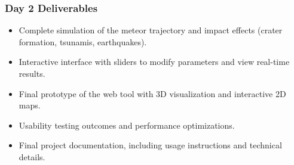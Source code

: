 \documentclass[conference]{IEEEtran}
\begin{document}
\subsubsection*{Day 2 Deliverables}
\begin{itemize}
	\item Complete simulation of the meteor trajectory and impact effects
	      (crater formation, tsunamis, earthquakes).
	\item Interactive interface with sliders to modify parameters and view
	      real-time results.
	\item Final prototype of the web tool with 3D visualization and interactive
	      2D maps.
	\item Usability testing outcomes and performance optimizations.
	\item Final project documentation, including usage instructions and technical
	      details.
\end{itemize}
\end{document}
